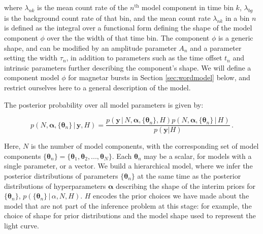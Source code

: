 \documentclass[12pt]{emulateapj}
\newcommand{\given}{\,|\,}
\newcommand{\counts}{y}
\newcommand{\pars}{\theta}
\newcommand{\mean}{\lambda}
\newcommand{\Poisson}{{\mathcal P}}
\newcommand{\bg}{\mathrm{bg}}
\newcommand{\word}{\phi}
\begin{document}
where $\mean_{nk}$ is the mean count rate of the $n^{\mathrm{th}}$ model component in time bin $k$, 
$\mean_{bg}$ is the background count rate of that bin,
and the mean count rate $\mean_{nk}$ in a bin $n$ is defined as the integral over a functional form defining the shape of
the model component $\word$ over the the width of that time bin. The component $\word$ is a generic shape,
and can be modified by an amplitude parameter $A_n$ and a parameter setting the width $\tau_n$, in addition to
parameters such as the time offset $t_n$ and intrinsic parameters further describing the component's shape.
We will define a component model $\word$ for magnetar bursts in Section \ref{sec:wordmodel} below, and
restrict ourselves here to a general description of the model.
 

The posterior probability over all model parameters is given by:

\begin{equation}
p(N, \bm{\alpha},\{\bm{\theta}_n \} \given \bm{\counts}, H) = \frac{p(\bm{\counts} \given N, \bm{\alpha}, \{\bm{\theta}_n \}, H) p(N, \bm{\alpha}, \{\bm{\theta}_n \} \given H)}{p(\bm{\counts} | H)} \, .
\end{equation}

Here, $N$ is the number of model components, with the corresponding set of model components $\{\bm{\theta}_n\} = \{ \bm{\theta}_1, \bm{\theta}_2, ..., \bm{\theta}_N \}$. Each $\bm{\theta}_n$ may be a scalar, for models with a single parameter, or a vector. 
We build a hierarchical model, where we infer the posterior distributions of parameters $\{\bm{\theta}_n\}$ at the same time as the posterior distributions of hyperparameters $\bm{\alpha}$ describing the shape
of the interim priors for  $\{\bm{\theta}_n\}$, $p(\{\bm{\theta}_n\}\given \alpha, N, H)$.
$H$ encodes the prior choices we have
made about the model that are not part of the inference problem at this stage: for example, the choice of shape for prior distributions and the model shape used to represent the light curve.
\end{document}
